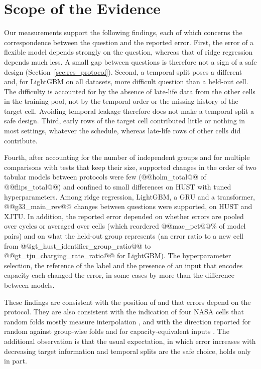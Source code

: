 \documentclass{ieeeaccess}
\begin{document}
\section{Scope of the Evidence}
\label{sec:discussion}
Our measurements support the following findings, each of which concerns the correspondence between the question and the reported error. First, the error of a flexible model depends strongly on the question, whereas that of ridge regression depends much less. A small gap between questions is therefore not a sign of a safe design (Section~\ref{sec:res_protocol}). Second, a temporal split poses a different and, for LightGBM on all datasets, more difficult question than a held-out cell. The difficulty is accounted for by the absence of late-life data from the other cells in the training pool, not by the temporal order or the missing history of the target cell. Avoiding temporal leakage therefore does not make a temporal split a safe design. Third, early rows of the target cell contributed little or nothing in most settings, whatever the schedule, whereas late-life rows of other cells did contribute.

Fourth, after accounting for the number of independent groups and for multiple comparisons with tests that keep their size, supported changes in the order of two tabular models between protocols were few (@@holm_total@@ of @@flips_total@@) and confined to small differences on HUST with tuned hyperparameters. Among ridge regression, LightGBM, a GRU and a transformer, @@g33_main_rev@@ changes between questions were supported, on HUST and XJTU. In addition, the reported error depended on whether errors are pooled over cycles or averaged over cells (which reordered @@mac_pct@@\% of model pairs) and on what the held-out group represents (an error ratio to a new cell from @@gt_hust_identifier_group_ratio@@ to @@gt_tju_charging_rate_ratio@@ for LightGBM). The hyperparameter selection, the reference of the label and the presence of an input that encodes capacity each changed the error, in some cases by more than the difference between models.

These findings are consistent with the position of \cite{sohail2026} and \cite{rizanov2026} that errors depend on the protocol. They are also consistent with the indication of four NASA cells that random folds mostly measure interpolation \cite{barua2026,le2026}, and with the direction reported for random against group-wise folds \cite{maher2025} and for capacity-equivalent inputs \cite{erdogan2026}. The additional observation is that the usual expectation, in which error increases with decreasing target information and temporal splits are the safe choice, holds only in part.
\end{document}
